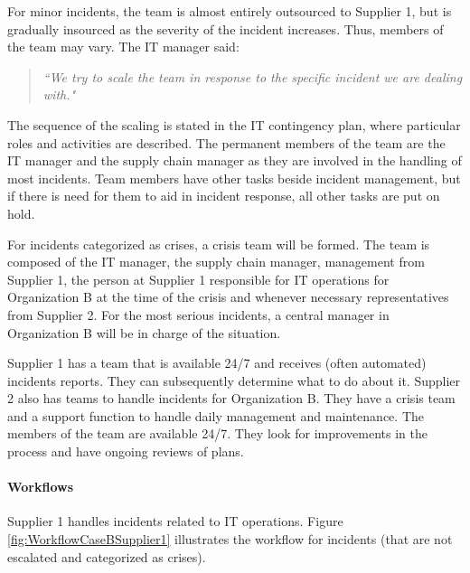 For minor incidents, the team is almost entirely outsourced to Supplier 1, but is gradually insourced as the severity of the incident increases. Thus, members of the team may vary. The IT manager said:

\begin{quote}
\textit{``We try to scale the team in response to the specific incident we are dealing with."}
\end{quote}

The sequence of the scaling is stated in the IT contingency plan, where particular roles and activities are described. The permanent members of the team are the IT manager and the supply chain manager as they are involved in the handling of most incidents. Team members have other tasks beside incident management, but if there is need for them to aid in incident response, all other tasks are put on hold.

For incidents categorized as crises, a crisis team will be formed. The team is composed of the IT manager, the supply chain manager, management from Supplier 1, the person at Supplier 1 responsible for IT operations for Organization B at the time of the crisis and whenever necessary representatives from Supplier 2. For the most serious incidents, a central manager in Organization B will be in charge of the situation.

Supplier 1 has a team that is available 24/7 and receives (often automated) incidents reports. They can subsequently determine what to do about it. Supplier 2 also has teams to handle incidents for Organization B. They have a crisis team and a support function to handle daily management and maintenance. The members of the team are available 24/7. They look for improvements in the process and have ongoing reviews of plans. 

\paragraph{Workflows}

Supplier 1 handles incidents related to IT operations. Figure \ref{fig:WorkflowCaseBSupplier1} illustrates the workflow for incidents (that are not escalated and categorized as crises).

